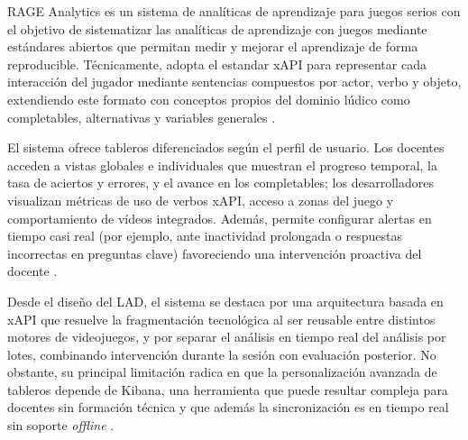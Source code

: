 RAGE Analytics es un sistema de analíticas de aprendizaje para juegos serios con el objetivo de sistematizar las analíticas de aprendizaje con juegos mediante estándares abiertos que permitan medir y mejorar el aprendizaje de forma reproducible. Técnicamente, adopta el estandar xAPI para representar cada interacción del jugador mediante sentencias compuestos por actor, verbo y objeto, extendiendo este formato con conceptos propios del dominio lúdico como completables, alternativas y variables generales \cite{rageanalitycs}.

El sistema ofrece tableros diferenciados según el perfil de usuario. Los docentes acceden a vistas globales e individuales que muestran el progreso temporal, la tasa de aciertos y errores, y el avance en los completables; los desarrolladores visualizan métricas de uso de verbos xAPI, acceso a zonas del juego y comportamiento de vídeos integrados. Además, permite configurar alertas en tiempo casi real (por ejemplo, ante inactividad prolongada o respuestas incorrectas en preguntas clave) favoreciendo una intervención proactiva del docente \cite{rageanalitycs}.

Desde el diseño del LAD, el sistema se destaca por una arquitectura basada en xAPI que resuelve la fragmentación tecnológica al ser reusable entre distintos motores de videojuegos, y por separar el análisis en tiempo real del análisis por lotes, combinando intervención durante la sesión con evaluación posterior. No obstante, su principal limitación radica en que la personalización avanzada de tableros depende de Kibana, una herramienta que puede resultar compleja para docentes sin formación técnica y que además la sincronización es en tiempo real sin soporte  \textit{offline} \cite{rageanalitycs}.

